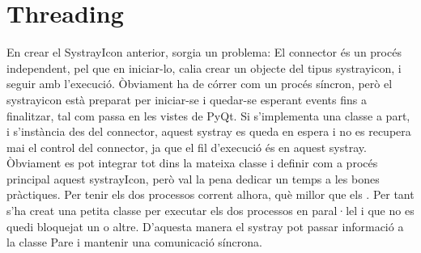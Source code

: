 \documentclass[letterpaper,11pt,catalan]{sphinxmanual}
\begin{document}
\section{Threading}
\label{\detokenize{index:threading}}
En crear el SystrayIcon anterior, sorgia un problema:
El connector és un procés independent, pel que en iniciar-lo, calia crear un objecte del tipus systrayicon, i seguir amb l'execució.
Òbviament ha de córrer com un procés síncron, però el systrayicon està preparat per iniciar-se i
quedar-se esperant events fins a finalitzar, tal com passa en les vistes de PyQt. Si
s'implementa una classe a part, i s'instància des del connector, aquest systray es queda en espera
i no es recupera mai el control del connector, ja que el fil d'execució és en aquest systray.
Òbviament es pot integrar tot dins la mateixa classe i definir com a procés principal aquest systrayIcon,
però val la pena dedicar un temps a les bones pràctiques. Per tenir els dos processos corrent alhora,
què millor que els . Per tant s'ha creat una petita classe per executar els dos
processos en paral·lel i que no es quedi bloquejat un o altre. D'aquesta manera el systray
pot passar informació a la classe Pare i mantenir una comunicació síncrona.

\begin{sphinxVerbatim}[commandchars=\\\{\}]
 
    
      
      

  
       
       
\end{sphinxVerbatim}
\end{document}
